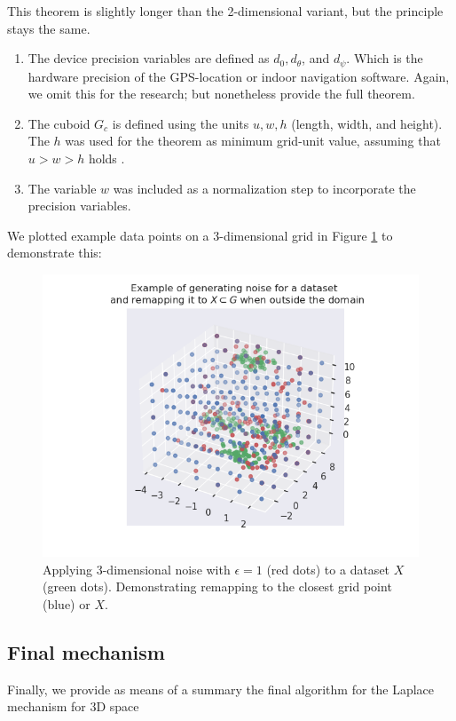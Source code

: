 This theorem is slightly longer than the 2-dimensional variant, but the principle stays the same.
\begin{enumerate}
  \item The device precision variables are defined as $d_0, d_\theta$, and $d_\psi$. Which is the hardware precision of the GPS-location or indoor navigation software.  Again, we omit this for the research; but nonetheless provide the full theorem.
  \item The cuboid $G_c$ is defined using the units $u, w, h$ (length, width, and height). The $h$ was used for the theorem as minimum grid-unit value, assuming that $u > w > h$ holds \citep{9646489}.
  \item The variable $w$ was included as a normalization step to incorporate the precision variables.
\end{enumerate}

We plotted example data points on a 3-dimensional grid in Figure \ref{fig:3d-laplace-example} to demonstrate this:
\begin{figure} [H]
  \includegraphics[width=\textwidth]{TheorethicalFramework/ND-Laplace/Images/example_3d_laplace.png}
  \caption{Applying 3-dimensional noise with $\epsilon = 1$ (red dots) to a dataset $X$ (green dots). Demonstrating remapping to the closest grid point (blue) or $X$.}
  \label{fig:3d-laplace-example}
\end{figure}

\newpage
\subsection{Final mechanism}
Finally, we provide as means of a summary the final algorithm for the Laplace mechanism for 3D space

\newpage